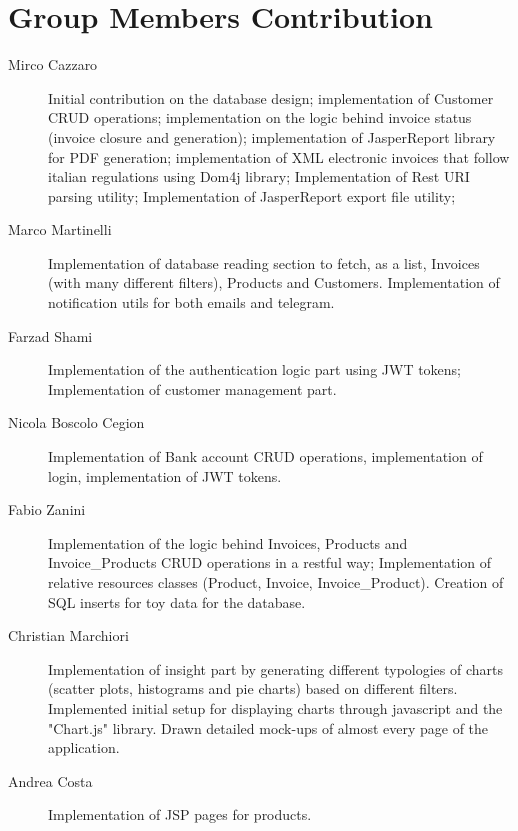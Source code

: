 \section{Group Members Contribution}


\begin{description}
	\item[Mirco Cazzaro] Initial contribution on the database design; implementation of Customer CRUD operations; implementation on the logic behind invoice status (invoice closure and generation); implementation of JasperReport library for PDF generation; implementation of XML electronic invoices that follow italian regulations using Dom4j library; Implementation of Rest URI parsing utility; Implementation of JasperReport export file utility;
	\item[Marco Martinelli] Implementation of database reading section to fetch, as a list, Invoices (with many different filters), Products and Customers. Implementation of notification utils for both emails and telegram. 
	\item[Farzad Shami] Implementation of the authentication logic part using JWT tokens; Implementation of customer management part.
	\item[Nicola Boscolo Cegion] Implementation of Bank account CRUD operations, implementation of login, implementation of JWT tokens.
	\item[Fabio Zanini] Implementation of the logic behind Invoices, Products and Invoice_Products CRUD operations in a restful way; Implementation of relative resources classes (Product, Invoice, Invoice_Product). Creation of SQL inserts for toy data for the database.
	\item[Christian Marchiori] Implementation of insight part by generating different typologies of charts (scatter plots, histograms and pie charts) based on different filters. Implemented initial setup for displaying charts through javascript and the "Chart.js" library. Drawn detailed mock-ups of almost every page of the application.
	\item[Andrea Costa] Implementation of JSP pages for products. 

\end{description}
